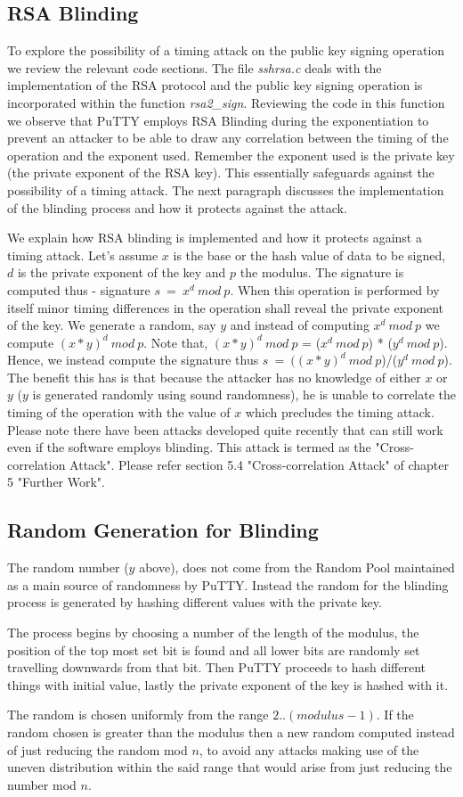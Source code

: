 \documentclass{bhamthesis}
\begin{document}
\subsection{RSA Blinding}
To explore the possibility of a timing attack on the public key signing operation we review the relevant code sections. The file \textit{sshrsa.c} deals with the implementation of the RSA protocol and the public key signing operation is incorporated within the function \textit{rsa2\_sign}. Reviewing the code in this function we observe that PuTTY employs RSA Blinding during the exponentiation to prevent an attacker to be able to draw any correlation between the timing of the operation and the exponent used. Remember the exponent used is the private key (the private exponent of the RSA key). This essentially safeguards against the possibility of a timing  attack. The next paragraph discusses the implementation of the blinding process and how it protects against the attack.\par
We explain how RSA blinding is implemented and how it protects against a timing attack. Let's assume \(x\) is the base or the hash value of data to be signed, \(d\) is the private exponent of the key and \(p\) the modulus. The signature is computed thus - signature \(s\ =\ x^d\ mod\ p\). When this operation is performed by itself minor timing differences in the operation shall reveal the private exponent of the key. We generate a random, say \(y\) and instead of computing  \(x^d\ mod\ p\) we compute \((x*y)^d\ mod\ p\). Note that, \((x*y)^d\ mod\ p\) = (\(x^d\ mod\ p\)) * (\(y^d\ mod\ p\)). Hence, we instead compute the signature thus \(s\ =\ ((x*y)^d\ mod\ p\))/(\(y^d\ mod\ p\)). The benefit this has is that because the attacker has no knowledge of either \(x\) or \(y\) (\(y\) is generated randomly using sound randomness), he is unable to correlate the timing of the operation with the value of \(x\) which precludes the timing attack. Please note there have been attacks developed quite recently that can still work even if the software employs blinding. This attack is termed as the "Cross-correlation Attack". Please refer section 5.4 "Cross-correlation Attack" \cite{vadnala} of chapter 5 "Further Work".
\subsection{Random Generation for Blinding}
The random number (\(y\) above), does not come from the Random Pool maintained as a main source of randomness by PuTTY. Instead the random for the blinding process is generated by hashing different values with the private key.\par
The process begins by choosing a number of the length of the modulus, the position of the top most set bit is found and all lower bits are randomly set travelling downwards from that bit. Then PuTTY proceeds to hash different things with initial value, lastly the private exponent of the key is hashed with it.\par
The random is chosen uniformly from the range \(2.. (modulus - 1)\). If the random chosen is greater than the modulus then a new random computed instead of just reducing the random mod \(n\), to avoid any attacks making use of the uneven distribution within the said range that would arise from just reducing the number mod \(n\).
\end{document}
